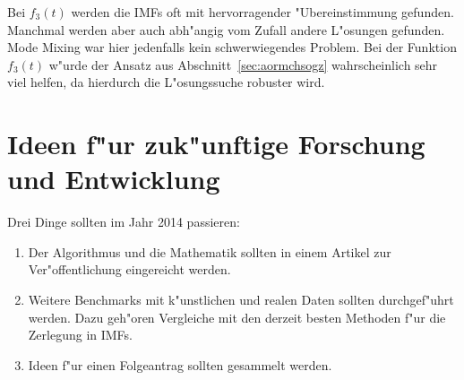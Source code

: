 \documentclass[a4paper]{scrartcl}
\begin{document}
Bei $f_3(t)$ werden die IMFs oft mit hervorragender "Ubereinstimmung gefunden. Manchmal werden aber auch abh"angig vom Zufall andere L"osungen gefunden. Mode Mixing war hier jedenfalls kein schwerwiegendes Problem. Bei der Funktion $f_3(t)$ w"urde der Ansatz aus Abschnitt~\ref{sec:aormchsogz} wahrscheinlich sehr viel helfen, da hierdurch die L"osungssuche robuster wird. 


\section{Ideen f"ur zuk"unftige Forschung und Entwicklung}

Drei Dinge sollten im Jahr 2014 passieren:
\begin{enumerate}
\item Der Algorithmus und die Mathematik sollten in einem Artikel zur Ver"offentlichung eingereicht werden. 
\item Weitere Benchmarks mit k"unstlichen und realen Daten sollten durchgef"uhrt werden. Dazu geh"oren Vergleiche mit den derzeit besten Methoden f"ur die Zerlegung in IMFs. 
\item Ideen f"ur einen Folgeantrag sollten gesammelt werden. 
\end{enumerate}




\end{document}
